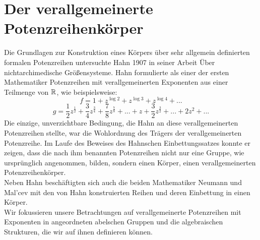 %
% 
%
%
%
%
%
\section{Der verallgemeinerte Potenzreihenkörper}
%
Die Grundlagen zur Konstruktion eines Körpers über sehr allgemein definierten formalen Potenzreihen untersuchte Hahn 1907 in seiner Arbeit \glqq Über nichtarchimedische Größensysteme\grqq. 
Hahn formulierte als einer der ersten Mathematiker Potenzreihen mit verallgemeinerten Exponenten aus einer Teilmenge von $\mathbb{R}$, wie beispielsweise:\\
\[ f = 1 + z^{\log 2} + z^{\log 3} + z^{\log 4} + ... \]
\[g = \frac{1}{2}z^{\frac{1}{2}} + \frac{3}{4}z^\frac{3}{4} + \frac{7}{8}z^\frac{7}{8} + ... + z + \frac{3}{2}z^\frac{3}{2} + ... + 2z^2 + ...\] 
Die einzige, unverzichtbare Bedingung, die Hahn an diese verallgemeinerten Potenzreihen stellte, war die Wohlordnung des Trägers der verallgemeinerten Potenzreihe.
Im Laufe des Beweises des Hahnschen Einbettungssatzes konnte er zeigen, dass die nach ihm benannten Potenzreihen nicht nur eine Gruppe, wie ursprünglich angenommen, bilden, sondern einen Körper, einen verallgemeinerten Potenzreihenkörper. \\ 
Neben Hahn beschäftigten sich auch die beiden Mathematiker Neumann und Mal'cev mit den von Hahn konstruierten Reihen und deren Einbettung in einen Körper. \\
Wir fokussieren unsere Betrachtungen auf verallgemeinerte Potenzreihen mit Exponenten in angeordneten abelschen Gruppen und die algebraischen Strukturen, die wir auf ihnen definieren können. 

